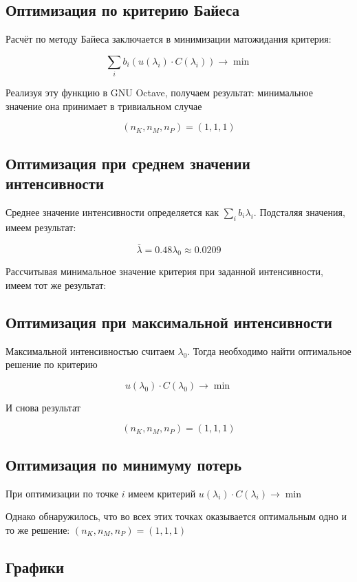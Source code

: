 \documentclass[12pt, a4paper] {ncc}
\begin{document}
\subsection{Оптимизация по критерию Байеса}

Расчёт по методу Байеса заключается в минимизации матожидания критерия:

$$\sum_i b_i \left(u(\lambda_i) \cdot C(\lambda_i)\right) \rightarrow \min$$

Реализуя эту функцию в GNU Octave, получаем результат: минимальное значение она
принимает в тривиальном случае

$$(n_K, n_M, n_P) = (1, 1, 1)$$

\subsection{Оптимизация при среднем значении интенсивности}

Среднее значение интенсивности определяется как $\sum_i b_i \lambda_i$.
Подсталяя значения, имеем результат:

$$\overline\lambda = 0.48\lambda_0 \approx 0.0209$$

Рассчитывая минимальное значение критерия при заданной интенсивности, имеем
тот же результат:

\subsection{Оптимизация при максимальной интенсивности}

Максимальной интенсивностью считаем $\lambda_0$. Тогда необходимо найти
оптимальное решение по критерию

$$u(\lambda_0) \cdot C(\lambda_0) \rightarrow \min$$

И снова результат

$$(n_K, n_M, n_P) = (1, 1, 1)$$

\subsection{Оптимизация по минимуму потерь}

При оптимизации по точке $i$ имеем критерий
$u(\lambda_i) \cdot C(\lambda_i) \rightarrow \min$

Однако обнаружилось, что во всех этих точках оказывается оптимальным одно и то
же решение: $(n_K, n_M, n_P) = (1, 1, 1)$

\subsection{Графики}
\end{document}
